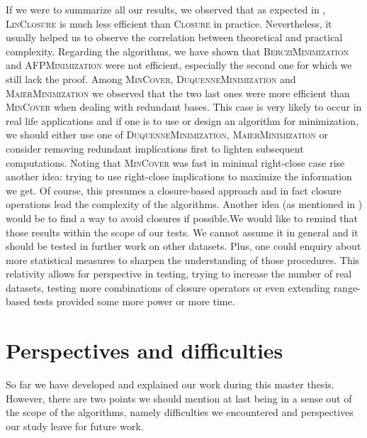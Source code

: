  If we were to summarize all our results, we observed that as expected
in \cite{bazhanov_optimizations_2014}, \textsc{LinClosure} is much less efficient than \textsc{Closure} in practice. Nevertheless, it usually helped
us to observe the correlation between theoretical and practical complexity.
Regarding the algorithms, we have shown that \textsc{BercziMinimization} and
\textsc{AFPMinimization} were not efficient, especially the second one for
which we still lack the proof. Among \textsc{MinCover}, \textsc{DuquenneMinimization} and \textsc{MaierMinimization} we observed that
the two last ones were more efficient than \textsc{MinCover} when dealing
with redundant bases. This case is very likely to occur in real life applications and if one is to use or design an algorithm for minimization, we should either use one of \textsc{DuquenneMinimization}, \textsc{MaierMinimization} or consider removing redundant implications first to lighten subsequent computations. Noting that \textsc{MinCover} was fast in minimal right-close case rise another idea: trying to use right-close implications to maximize the information we get. Of course, this presumes a closure-based approach and in fact closure operations lead the complexity of the algorithms. Another idea (as mentioned in \cite{duquenne_variations_2007}) would be to find a way to avoid closures if possible.We would like to remind that those results within the scope of our tests. We cannot assume it in general and it should be tested in further work on other datasets. Plus, one could enquiry about more statistical measures to sharpen the understanding of those procedures. This relativity allows for perspective in testing, trying to
increase the number of real datasets, testing more combinations of closure
operators or even extending range-based tests provided some more power or
more time.

\section{Perspectives and difficulties}

So far we have developed and explained our work during this master thesis. However, there are two points we should mention at last being in a sense out of 
the scope of the algorithms, namely difficulties we encountered and perspectives
our study leave for future work. 

\vspace{1.2em}

